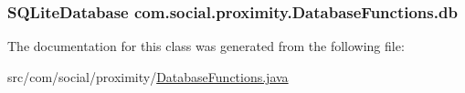 \subsubsection[{db}]{\setlength{\rightskip}{0pt plus 5cm}S\+Q\+Lite\+Database com.\+social.\+proximity.\+Database\+Functions.\+db\hspace{0.3cm}{\ttfamily [private]}}\label{classcom_1_1social_1_1proximity_1_1_database_functions_a6b12c0a8d4be24df06fbc5117840e2e1}


The documentation for this class was generated from the following file\+:\begin{DoxyCompactItemize}
\item 
src/com/social/proximity/\hyperlink{_database_functions_8java}{Database\+Functions.\+java}\end{DoxyCompactItemize}
